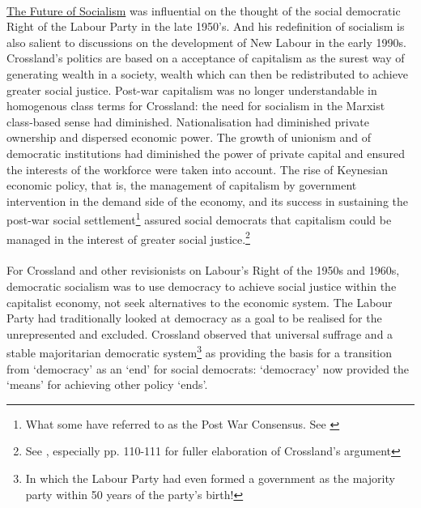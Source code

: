\documentclass[13pt]{article}
\begin{document}
\begin{onehalfspace}
\paragraph{} \underline{The Future of Socialism} was influential on the thought of the social democratic Right of the Labour Party in the late 1950's. And his redefinition of socialism is also salient to discussions on the development of New Labour in the early 1990s. Crossland's politics are based on a acceptance of capitalism as the surest way of generating wealth in a society, wealth which can then be redistributed to achieve greater social justice. Post-war capitalism was no longer understandable in homogenous class terms for Crossland: the need for socialism in the Marxist class-based sense had diminished. Nationalisation had diminished private ownership and dispersed economic power. The growth of unionism and of democratic institutions had diminished the power of private capital and ensured the interests of the workforce were taken into account. The rise of Keynesian economic policy, that is, the management of capitalism by government intervention in the demand side of the economy, and its success in sustaining the post-war social settlement\footnote{What some have referred to as the Post War Consensus. See \cite[Chapter 2.]{Kavanagh:1997rt}} assured social democrats that capitalism could be managed in the interest of greater social justice.\footnote{See , especially pp. 110-111 for fuller elaboration of Crossland's argument}

\paragraph{}For Crossland and other revisionists on Labour's Right of the 1950s and 1960s, democratic socialism was to use democracy to achieve social justice within the capitalist economy, not seek alternatives to the economic system. The Labour Party had traditionally looked at democracy as a goal to be realised for the unrepresented and excluded. Crossland observed that universal suffrage and a stable majoritarian democratic system\footnote{In which the Labour Party had even formed a government as the majority party within 50 years of the party's birth!} as providing the basis for a transition from `democracy' as an `end' for social democrats: `democracy' now provided the `means' for achieving other policy `ends'.


\end{onehalfspace}
\end{document}
